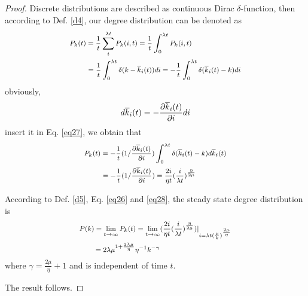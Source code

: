\documentclass[final]{IEEEtran}
\begin{document}
\begin{proof}
Discrete distributions are described as continuous Dirac
$\delta$-function, then according to Def. \ref{d4}, our degree
distribution can be denoted as
\begin{equation}\label{eq27}\footnotesize
\begin{aligned}
&\hspace{0cm}P_{k}(t)=\frac{1}{t}\sum \limits_{i}^{\lambda t}
P_{k}(i,t)=\frac{1}{t}\int_{0}^{\lambda t}
P_{k}(i,t)\\
&\hspace{0.7cm}=\frac{1}{t}\int_{0}^{\lambda
t}\delta(k-\overline{k}_{i}(t))di=-\frac{1}{t}\int_{0}^{\lambda
t}\delta(\overline{k}_{i}(t)-k)di
\end{aligned}
\end{equation}
obviously,
\begin{equation}\footnotesize
d\overline{k}_{i}(t)=-\frac{\partial \overline{k}_{i}(t)}{\partial
i}di
\end{equation}
insert it in Eq. \ref{eq27}, we obtain that
\begin{equation}\label{eq28}\footnotesize
\begin{aligned}
&\hspace{0cm}P_{k}(t)=-\frac{1}{t}(1/\frac{\partial
\overline{k}_{i}(t)}{\partial
i})\int_{0}^{\lambda t}\delta(\overline{k}_{i}(t)-k)d\overline{k}_{i}(t)\\
&\hspace{0.7cm}=-\frac{1}{t}(1/\frac{\partial
\overline{k}_{i}(t)}{\partial i})=\frac{2i}{\eta
t}(\frac{i}{\lambda t})^{\frac{\eta}{2\mu}}
\end{aligned}
\end{equation}

According to Def. \ref{d5}, Eq. \ref{eq26} and \ref{eq28}, the
steady state degree distribution is
\begin{equation}\label{eq30}\footnotesize
\begin{aligned}
&\hspace{0cm}P(k)=\lim\limits_{t\rightarrow\infty}P_{k}(t)=\lim\limits_{t\rightarrow\infty}(\frac{2
i}{\eta t}(\frac{i}{\lambda t})^{\frac{\eta}{2
\mu}})|_{i=\lambda t(\frac{\mu}{k})^{\frac{2\mu}{\eta}}}\\
&\hspace{0.6cm}=2\lambda\mu^{1+\frac{2\lambda\mu}{\eta}}\eta^{-1}k^{-\gamma}
\end{aligned}
\end{equation}
where $\gamma$$=$$\frac{2\mu}{\eta}+1$ and is independent of time
$t$.

The result follows.
\end{proof}
\end{document}
